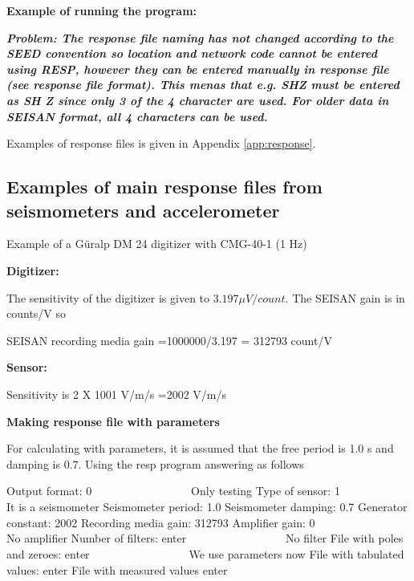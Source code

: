 \textbf{Example of running the program:}



\textit{\textbf{Problem: The response file naming has not changed according to the SEED convention so location and network code cannot be entered using RESP, however they can be entered manually in response file (see response file format). This menas that e.g. SHZ must be entered as SH Z since only 3 of the 4 character are used. For older data in SEISAN format, all 4 characters can be used.}}

Examples of response files is given in Appendix \ref{app:response}.

\subsection{Examples of main response files from seismometers and accelerometer} 

Example of a G\"uralp DM 24 digitizer with CMG-40-1 (1 Hz) 

\textbf{Digitizer:}

The sensitivity of the digitizer is given to $3.197 \mu V/count$. The SEISAN gain is in counts/V so 

SEISAN recording media gain =1000000/3.197 = 312793 count/V 

\textbf{Sensor:}

Sensitivity is 2 X 1001 V/m/s =2002 V/m/s 

\textbf{Making response file with parameters}

For calculating with parameters, it is assumed that the free period is 1.0 s and damping is 0.7. Using the resp program answering as follows 

Output format: 0 \verb|                | Only testing \newline
Type of sensor: 1 \verb|                | It is a seismometer \newline
Seismometer period: 1.0 \newline
Seismometer damping: 0.7 \newline
Generator constant: 2002 \newline
Recording media gain: 312793 \newline
Amplifier gain: 0  \verb|                |  No amplifier \newline
Number of filters: enter \verb|                | No filter \newline
File with poles and zeroes: enter \verb|                | We use parameters now \newline
File with tabulated values: enter \newline
File with measured values enter 

